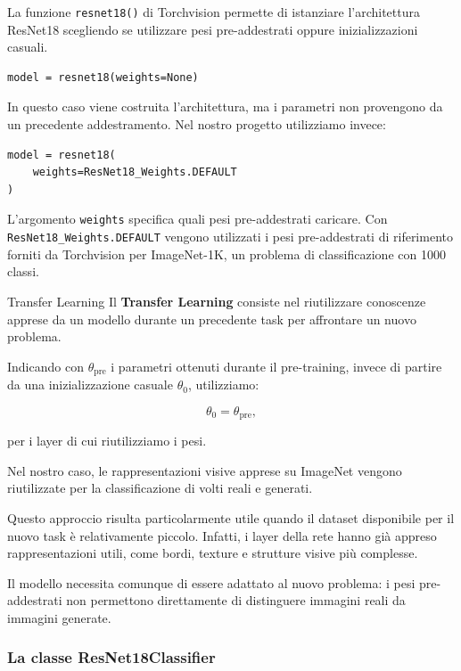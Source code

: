 \documentclass[10pt,a4paper,oneside]{book}
\begin{document}
La funzione \texttt{resnet18()} di Torchvision permette di
istanziare l'architettura ResNet18 scegliendo se utilizzare
pesi pre-addestrati oppure inizializzazioni casuali.

\begin{verbatim}
model = resnet18(weights=None)
\end{verbatim}

In questo caso viene costruita l'architettura, ma i parametri
non provengono da un precedente addestramento. Nel nostro progetto utilizziamo invece:

\begin{verbatim}
model = resnet18(
    weights=ResNet18_Weights.DEFAULT
)
\end{verbatim}

L'argomento \texttt{weights} specifica quali pesi pre-addestrati
caricare. Con \texttt{ResNet18\_Weights.DEFAULT} vengono
utilizzati i pesi pre-addestrati di riferimento forniti
da Torchvision per ImageNet-1K, un problema di classificazione con 1000 classi.

\begin{definitionbox}{Transfer Learning}
Il \textbf{Transfer Learning} consiste nel riutilizzare
conoscenze apprese da un modello durante un precedente task
per affrontare un nuovo problema.

Indicando con $\theta_{\mathrm{pre}}$ i parametri ottenuti
durante il pre-training, invece di partire da una
inizializzazione casuale $\theta_0$, utilizziamo:

\[
\theta_0 = \theta_{\mathrm{pre}},
\]

per i layer di cui riutilizziamo i pesi.

Nel nostro caso, le rappresentazioni visive apprese
su ImageNet vengono riutilizzate per la classificazione
di volti reali e generati.
\end{definitionbox}

Questo approccio risulta particolarmente utile quando
il dataset disponibile per il nuovo task è relativamente
piccolo. Infatti, i layer della rete hanno già appreso
rappresentazioni utili, come bordi, texture e strutture
visive più complesse.

Il modello necessita comunque di essere adattato al nuovo
problema: i pesi pre-addestrati non permettono direttamente
di distinguere immagini reali da immagini generate.

\subsubsection{La classe ResNet18Classifier}
\end{document}
